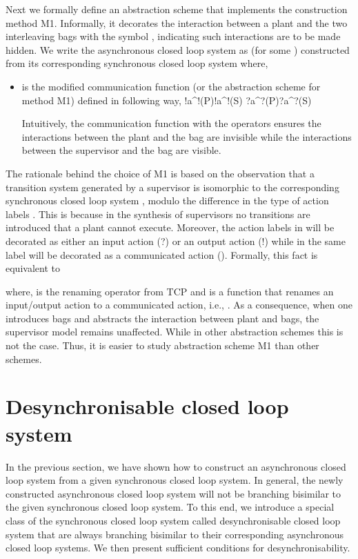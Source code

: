 \documentclass[copyright]{eptcs}
\theoremstyle{plain}
\theoremstyle{definition}
\begin{document}
Next we formally define an abstraction scheme that implements the construction method M1. Informally, it decorates the interaction between a plant and the two interleaving bags with the symbol , indicating such interactions are to be made hidden. We write the asynchronous closed loop system as  (for some ) constructed from its corresponding synchronous closed loop system  where,
\begin{itemize}
\item  is the modified communication function (or the abstraction scheme for method M1) defined in following way,\newline
!a\in\alpha^!(P)!a\in\alpha^!(S)
?a\in\alpha^?(P)?a\in\alpha^?(S)

Intuitively, the communication function  with the operators  ensures the interactions between the plant and the bag are invisible while the interactions between the supervisor and the bag are visible.
\end{itemize}

The rationale behind the choice of M1 is based on the observation that a transition system generated by a supervisor  is isomorphic to the corresponding synchronous closed loop system , modulo the difference in the type of action labels \citep{prDCL}. This is because in the synthesis of supervisors no transitions are introduced that a plant cannot execute. Moreover, the action labels in  will be decorated as either an input action (?) or an output action (!) while in  the same label will be decorated as a communicated action (). Formally, this fact is equivalent to

where,  is the renaming operator from TCP \cite{acpbook} and  is a function that renames an input/output action to a communicated action, i.e., .
As a consequence, when one introduces bags and abstracts the interaction between plant and bags, the supervisor model remains unaffected. While in other abstraction schemes this is not the case. Thus, it is easier to study abstraction scheme M1 than other schemes. 
\section{Desynchronisable closed loop system}\label{sec:DCL}

In the previous section, we have shown how to construct an asynchronous closed loop system from a given synchronous closed loop system. In general, the newly constructed asynchronous closed loop system will not be branching bisimilar to the given synchronous closed loop system. To this end, we introduce a special class of the synchronous closed loop system called desynchronisable closed loop system that are always branching bisimilar to their corresponding asynchronous closed loop systems. We then present sufficient conditions for desynchronisability.
\end{document}
